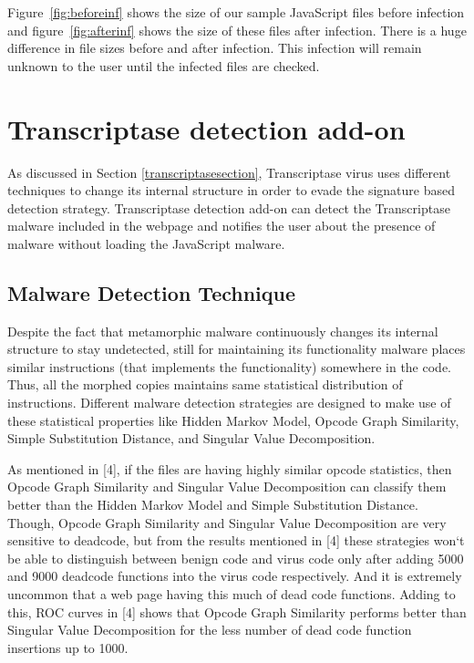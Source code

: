Figure~\ref{fig:beforeinf} shows the size of our sample JavaScript files before infection and figure~\ref{fig:afterinf} shows the size of these files after infection. There is a huge difference in file sizes before and after infection. This infection will remain unknown to the user until the infected files are checked.

\section{Transcriptase detection add-on} 

As discussed in Section \ref{transcriptasesection}, Transcriptase virus uses different techniques to change its internal structure in order to evade the signature based detection strategy. Transcriptase detection add-on can detect the Transcriptase malware included in the webpage and notifies the user about the presence of malware without loading the JavaScript malware.

\subsection{Malware Detection Technique} 
Despite the fact that metamorphic malware continuously changes its internal structure to stay undetected, still for maintaining its functionality malware places similar instructions (that implements the functionality) somewhere in the code. Thus, all the morphed copies maintains same statistical distribution of instructions. Different malware detection strategies are designed to make use of these statistical properties like Hidden Markov Model, Opcode Graph Similarity, Simple Substitution Distance, and Singular Value Decomposition.

As mentioned in [4], if the files are having highly similar opcode statistics, then Opcode Graph Similarity and Singular Value Decomposition can classify them better than the Hidden Markov Model and Simple Substitution Distance. Though, Opcode Graph Similarity and Singular Value Decomposition are very sensitive to deadcode, but from the results mentioned in [4] these strategies won`t be able to distinguish between benign code and virus code only after adding 5000 and 9000 deadcode functions into the virus code respectively. And it is extremely uncommon that a web page having this much of dead code functions. Adding to this, ROC curves in [4] shows that Opcode Graph Similarity performs better than Singular Value Decomposition for the less number of dead code function insertions up to 1000.

